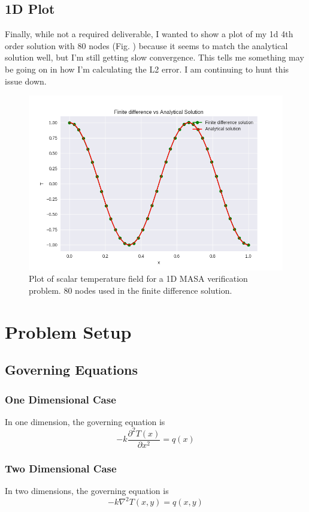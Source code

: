 \documentclass[letterpaper,12pt]{article}
\begin{document}
\subsection{1D Plot}
Finally, while not a required deliverable, I wanted to show a plot of my 1d 4th order solution with 80 nodes (Fig. ) because it seems to match the analytical solution well, but I'm still getting slow convergence. This tells me something may be going on in how I'm calculating the L2 error. I am continuing to hunt this issue down.

\begin{figure}[h]
\centering
\label{fig:1dplot}
\includegraphics[width=1 \textwidth]{1d4th_soln.png}
\caption{Plot of scalar temperature field for a 1D MASA verification problem. 80 nodes used in the finite difference solution.}
\end{figure}

\section{Problem Setup}
\subsection{Governing Equations}
\subsubsection{One Dimensional Case}
In one dimension, the governing equation is
\begin{equation}
\label{gov1}
-k \frac{\partial^2 T(x)}{\partial x^2} = q(x)
\end{equation}
\subsubsection{Two Dimensional Case}
In two dimensions, the governing equation is
\begin{equation}
\label{gov2}
-k \nabla^2 T(x,y) = q(x,y)
\end{equation}
\end{document}
